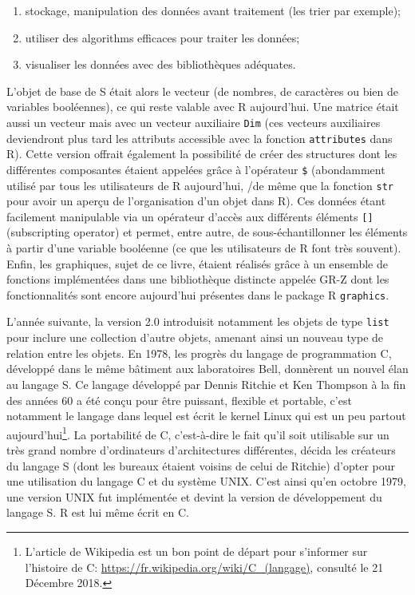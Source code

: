 \documentclass[]{article}
\providecommand{\tightlist}{%
  \setlength{\itemsep}{0pt}\setlength{\parskip}{0pt}}
\begin{document}
\begin{enumerate}
\def\labelenumi{\arabic{enumi}.}
\tightlist
\item
  stockage, manipulation des données avant traitement (les trier par exemple);
\item
  utiliser des algorithms efficaces pour traiter les données;
\item
  visualiser les données avec des bibliothèques adéquates.
\end{enumerate}

L'objet de base de S était alors le vecteur (de nombres, de caractères ou bien de variables booléennes), ce qui reste valable avec R aujourd'hui. Une matrice
était aussi un vecteur mais avec un vecteur auxiliaire \texttt{Dim} (ces vecteurs
auxiliaires deviendront plus tard les attributs accessible avec la fonction
\texttt{attributes} dans R). Cette version offrait également la possibilité de créer
des structures dont les différentes composantes étaient appelées grâce à
l'opérateur \texttt{\$} (abondamment utilisé par tous les utilisateurs de R
aujourd'hui, /de même que la fonction \texttt{str} pour avoir un aperçu de l'organisation d'un objet dans R). Ces données étant facilement manipulable via un opérateur d'accès aux différents éléments \texttt{{[}{]}} (subscripting operator) et permet, entre autre, de sous-échantillonner les éléments à partir d'une variable booléenne (ce que les utilisateurs de R font très souvent). Enfin, les graphiques, sujet de ce livre, étaient réalisés grâce à un ensemble de fonctions implémentées dans une bibliothèque distincte appelée GR-Z dont les fonctionnalités sont encore aujourd'hui présentes dans le package R \texttt{graphics}.

L'année suivante, la version 2.0 introduisit notamment les objets de type \texttt{list} pour inclure une collection d'autre objets, amenant ainsi un nouveau type de relation entre les objets. En 1978, les progrès du langage de programmation C, développé dans le même bâtiment aux laboratoires Bell, donnèrent un nouvel élan au langage S. Ce langage développé par Dennis Ritchie et Ken Thompson à la fin des années 60 a été conçu pour être puissant, flexible et
portable, c'est notamment le langage dans lequel est écrit le kernel Linux qui
est un peu partout aujourd'hui\footnote{L'article de Wikipedia est un bon point de départ pour s'informer sur l'histoire de C: \url{https://fr.wikipedia.org/wiki/C_(langage)}, consulté le 21 Décembre 2018.}. La portabilité de C, c'est-à-dire le fait qu'il soit utilisable sur un très grand nombre d'ordinateurs d'architectures différentes, décida les créateurs du langage S (dont les bureaux étaient voisins de celui de Ritchie) d'opter pour une utilisation du langage C et du système UNIX. C'est ainsi qu'en octobre 1979, une version UNIX fut implémentée et devint la version de développement du langage S. R est lui
même écrit en C.
\end{document}
